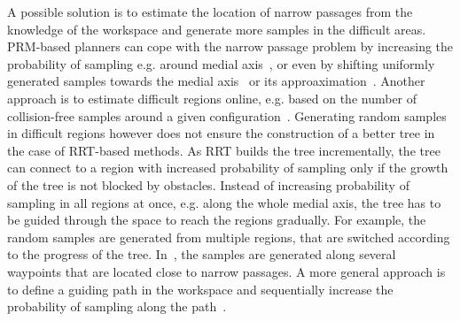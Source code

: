 \documentclass[usletter, 10pt, conference]{svjour3}      %
\begin{document}
A possible solution is to estimate the location of narrow passages from the knowledge of the workspace and generate more samples
in the difficult areas.
PRM-based planners can cope with the narrow passage problem by increasing the probability of sampling e.g.
around medial axis~\cite{amatoOBRRT,amato2002using,wilmarthMAPRM}, or even by shifting
uniformly generated samples towards the medial axis~\cite{amatoOBPRM} or its approaximation~\cite{hollemanMAPRM}.
Another approach is to estimate difficult regions online, e.g. based on the number of collision-free samples around a given configuration~\cite{overmarsGauss,hsuBridge}.
Generating random samples in difficult regions however does not ensure the construction of a better tree in the case of RRT-based methods.
As RRT builds the tree incrementally, the tree can connect to a region with increased probability of sampling only if the growth
of the tree is not blocked by obstacles.
Instead of increasing probability of sampling in all regions at once, e.g. along the whole medial axis, the tree has to be guided through the space to reach the regions gradually.
For example, the random samples are generated from multiple regions, that are switched according to the progress of the tree.
In~\cite{kardossRRTKK}, the samples are generated along several waypoints that are located close to narrow passages.
A more general approach is to define a guiding path in the workspace and sequentially increase the probability of sampling along
the path~\cite{vonasek2009rrt,denny2014marrt,denny2016dynamic}.

%
\end{document}
